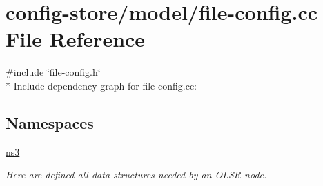 \hypertarget{file-config_8cc}{}\section{config-\/store/model/file-\/config.cc File Reference}
\label{file-config_8cc}
{\ttfamily \#include \char`\"{}file-\/config.\+h\char`\"{}}\\*
Include dependency graph for file-\/config.cc\+:
\subsection*{Namespaces}
\begin{DoxyCompactItemize}
\item 
 \hyperlink{namespacens3}{ns3}
\begin{DoxyCompactList}\small\item\em Here are defined all data structures needed by an O\+L\+SR node. \end{DoxyCompactList}\end{DoxyCompactItemize}
